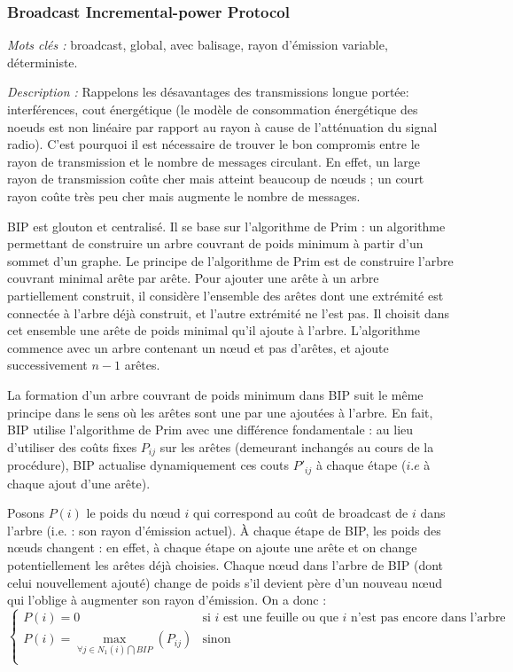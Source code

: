 \subsubsection{Broadcast Incremental-power Protocol \cite{Wieselthier2000}}

\emph{Mots clés :} broadcast, global, avec balisage, rayon d'émission variable, déterministe.

\emph{Description :} Rappelons les désavantages des transmissions longue portée: interférences, cout énergétique (le modèle de consommation énergétique des noeuds est non linéaire par rapport au rayon à cause de l'atténuation du signal radio).
C'est pourquoi il est nécessaire de trouver le bon compromis entre le rayon de transmission et le nombre de messages circulant. En effet, un large rayon de transmission coûte cher mais atteint beaucoup de nœuds ; un court rayon coûte très peu cher mais augmente le nombre de messages. 

BIP est glouton et centralisé. Il se base sur l'algorithme de Prim \cite{Prim1957} : un algorithme permettant de construire un arbre couvrant de poids minimum à partir d'un sommet d'un graphe. Le principe de l'algorithme de Prim est de construire l'arbre couvrant minimal arête par arête. Pour ajouter une arête à un arbre partiellement construit, il considère l'ensemble des arêtes dont une extrémité est connectée à l'arbre déjà construit, et l'autre extrémité ne l'est pas. Il choisit dans cet ensemble une arête de poids minimal qu'il ajoute à l'arbre. L'algorithme commence avec un arbre contenant un nœud et pas d'arêtes, et ajoute successivement $n-1$ arêtes.

La formation d'un arbre couvrant de poids minimum dans BIP suit le même principe dans le sens où les arêtes sont une par une ajoutées à l'arbre. En fait, BIP utilise l'algorithme de Prim avec une différence fondamentale : au lieu d'utiliser des coûts fixes $P_{ij}$ sur les arêtes (demeurant inchangés au cours de la procédure), BIP actualise dynamiquement ces couts $P'_{ij}$ à chaque étape ($i.e$ à chaque ajout d'une arête).

Posons $P(i)$ le poids du nœud $i$ qui correspond au coût de broadcast de $i$ dans l'arbre (i.e. : son rayon d'émission actuel). À chaque étape de BIP, les poids des nœuds changent : en effet, à chaque étape on ajoute une arête et on change potentiellement les arêtes déjà choisies. Chaque nœud dans l'arbre de BIP (dont celui nouvellement ajouté) change de poids s'il devient père d'un nouveau nœud qui l'oblige à augmenter son rayon d'émission. On a donc :
$$\begin{cases}
	P(i)=0  & \text{si $i$ est une feuille ou que $i$ n'est pas encore dans l'arbre}\\
	P(i)=\max\limits_{\forall j\in N_1(i)\bigcap BIP}(P_{ij}) & \text{sinon}\\
\end{cases}$$

